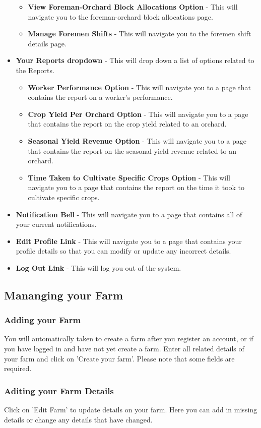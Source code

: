 \documentclass[11pt,fleqn]{book} %
\begin{document}
\begin{itemize}
\begin{itemize}
				\item \textbf{View Foreman-Orchard Block Allocations Option} - This will navigate you to the foreman-orchard block allocations page.
				\item \textbf{Manage Foremen Shifts} - This will navigate you to the foremen shift details page.
			\end{itemize}
			\item \textbf{Your Reports dropdown} - This will drop down a list of options related to the Reports.
			\begin{itemize}
				\item \textbf{Worker Performance Option} - This will navigate you to a page that contains the report on a worker's performance.
				\item \textbf{Crop Yield Per Orchard Option} - This will navigate you to a page that contains the report on the crop yield related to an orchard.
				\item \textbf{Seasonal Yield Revenue Option} - This will navigate you to a page that contains the report on the seasonal yield revenue related to an orchard.
				\item \textbf{Time Taken to Cultivate Specific Crops Option} - This will navigate you to a page that contains the report on the time it took to cultivate specific crops.	
			\end{itemize}
			\item \textbf{Notification Bell} - This will navigate you to a page that contains all of your current notifications.
			\item \textbf{Edit Profile Link} - This will navigate you to a page that contains your profile details so that you can modify or update any incorrect details.
			\item \textbf{Log Out Link} - This will log you out of the system.
		\end{itemize}
		\subsection{Mananging your Farm}
			\subsubsection{Adding your Farm}
			 You will automatically taken to create a farm after you register an account, or if you have logged in and have not yet create a farm. Enter all related details of your farm and click on 'Create your farm'. Please note that some fields are required.
			\subsubsection{Aditing your Farm Details}
			Click on 'Edit Farm' to update details on your farm. Here you can add in missing details or change any details that have changed.
\end{document}
